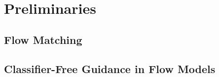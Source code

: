 \section{Preliminaries}\label{sec:background}
\subsection{Flow Matching}
\subsection{Classifier-Free Guidance in Flow Models}
